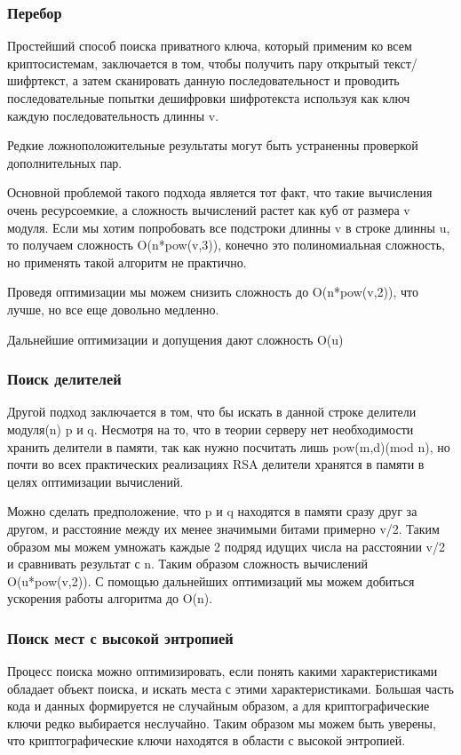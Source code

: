 \documentclass[20pt]{article}
\begin{document}
\subsubsection{Перебор}
Простейший способ поиска приватного ключа, который применим ко всем
криптосистемам, заключается в том, чтобы получить пару открытый текст/шифртекст,
а затем сканировать данную последовательност и проводить последовательные попытки
дешифровки шифротекста используя как ключ каждую последовательность длинны v.

Редкие ложноположительные результаты могут быть устраненны проверкой
дополнительных пар.

Основной проблемой такого подхода является тот факт, что такие вычисления очень
ресурсоемкие, а сложность вычислений растет как куб от размера v модуля. Если мы
хотим попробовать все подстроки длинны v в строке длинны u, то получаем сложность
O(n*pow(v,3)), конечно это полиномиальная сложность, но применять такой алгоритм
не практично.

Проведя оптимизации мы можем снизить сложность до O(n*pow(v,2)), что лучше, но
все еще довольно медленно.

Дальнейшие оптимизации и допущения дают сложность O(u)

\subsubsection{Поиск делителей}
Другой подход заключается в том, что бы искать в данной строке делители модуля(n)
p и q. Несмотря на то, что в теории серверу нет необходимости хранить делители в
памяти, так как нужно посчитать лишь pow(m,d)(mod n), но почти во всех практических
реализациях RSA делители хранятся в памяти в целях оптимизации вычислений.

Можно сделать предположение, что p и q находятся в памяти сразу друг за другом,
и расстояние между их менее значимыми битами примерно v/2. Таким образом мы можем
умножать каждые 2 подряд идущих числа на расстоянии v/2 и сравнивать результат с
n. Таким образом сложность вычислений O(u*pow(v,2)). С помощью дальнейших оптимизаций
мы можем добиться ускорения работы алгоритма до O(n).

\subsubsection{Поиск мест с высокой энтропией}
Процесс поиска можно оптимизировать, если понять какими характеристиками обладает
объект поиска, и искать места с этими характеристиками. Большая часть кода и данных
формируется не случайным образом, а для криптографические ключи редко выбирается
неслучайно. Таким образом мы можем быть уверены, что криптографические ключи находятся
в области с высокой энтропией.
\end{document}
